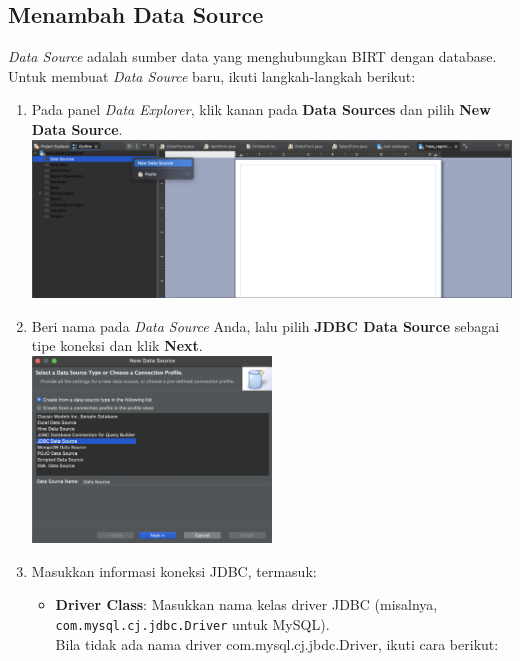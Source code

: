 \subsection{Menambah Data Source}

\textit{Data Source} adalah sumber data yang menghubungkan BIRT dengan database. Untuk membuat \textit{Data Source} baru, ikuti langkah-langkah berikut:

\begin{enumerate}
	\item Pada panel \textit{Data Explorer}, klik kanan pada \textbf{Data Sources} dan pilih \textbf{New Data Source}. \\
	\includegraphics[width=1\textwidth]{assets/pertemuan14/Data-Source/birt-pre-new-data-source.png}
	
	\item Beri nama pada \textit{Data Source} Anda, lalu pilih \textbf{JDBC Data Source} sebagai tipe koneksi dan klik \textbf{Next}. \\
	\includegraphics[width=0.5\textwidth]{assets/pertemuan14/Data-Source/birt-select-data-source-type.png}
	
	\item Masukkan informasi koneksi JDBC, termasuk:
	\begin{itemize}
			\item \textbf{Driver Class}: Masukkan nama kelas driver JDBC (misalnya, \texttt{com.mysql.cj.jdbc.Driver} untuk MySQL).\\
			Bila tidak ada nama driver {com.mysql.cj.jbdc.Driver}, ikuti cara berikut:
			

\end{itemize}
\end{enumerate}
